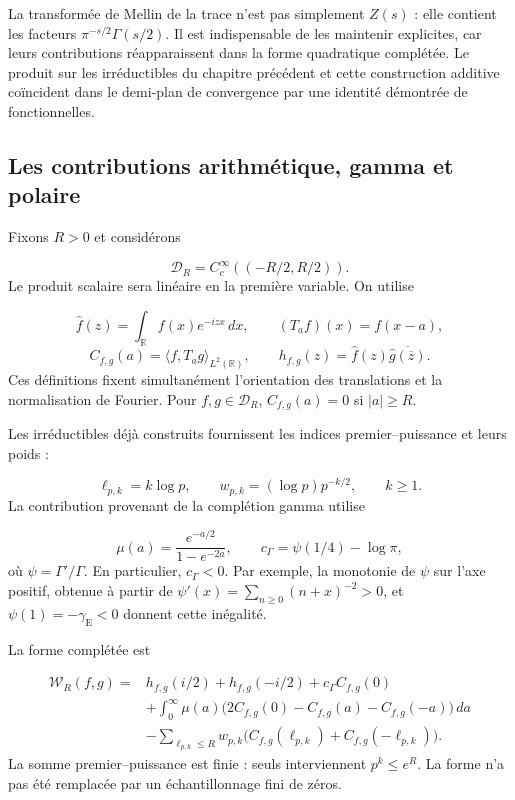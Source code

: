 La transformée de Mellin de la trace n'est pas simplement \(Z(s)\) : elle contient les facteurs \(\pi^{-s/2}\Gamma(s/2)\). Il est indispensable de les maintenir explicites, car leurs contributions réapparaissent dans la forme quadratique complétée. Le produit sur les irréductibles du chapitre précédent et cette construction additive coïncident dans le demi-plan de convergence par une identité démontrée de fonctionnelles.

\subsection{Les contributions arithmétique, gamma et polaire}
\label{rz:forma}
Fixons \(R>0\) et considérons

\[
\mathcal D_R=C_c^\infty((-R/2,R/2)).
\]
Le produit scalaire sera linéaire en la première variable. On utilise

\[
\widehat f(z)=\int_{\mathbb R}f(x)e^{-izx}\,dx,\qquad
(T_af)(x)=f(x-a),
\]
\[
C_{f,g}(a)=\langle f,T_ag\rangle_{L^2(\mathbb R)},\qquad
h_{f,g}(z)=\widehat f(z)\overline{\widehat g(\overline z)}.
\]
Ces définitions fixent simultanément l'orientation des translations et la normalisation de Fourier. Pour \(f,g\in\mathcal D_R\), \(C_{f,g}(a)=0\) si \(|a|\geq R\).

Les irréductibles déjà construits fournissent les indices premier–puissance et leurs poids :

\[
\ell_{p,k}=k\log p,\qquad
w_{p,k}=(\log p)p^{-k/2},\qquad k\geq1.
\]
La contribution provenant de la complétion gamma utilise

\[
\mu(a)=\frac{e^{-a/2}}{1-e^{-2a}},\qquad
c_\Gamma=\psi(1/4)-\log\pi,
\]
où \(\psi=\Gamma'/\Gamma\). En particulier, \(c_\Gamma<0\). Par exemple, la monotonie de \(\psi\) sur l’axe positif, obtenue à partir de \(\psi'(x)=\sum_{n\geq0}(n+x)^{-2}>0\), et \(\psi(1)=-\gamma_{\mathrm E}<0\) donnent cette inégalité.

La forme complétée est

\[
\begin{aligned}
\mathscr W_R(f,g)={}&h_{f,g}(i/2)+h_{f,g}(-i/2)
+c_\Gamma C_{f,g}(0)\\
&+\int_0^\infty\mu(a)
\bigl(2C_{f,g}(0)-C_{f,g}(a)-C_{f,g}(-a)\bigr)\,da\\
&-\sum_{\ell_{p,k}\leq R}w_{p,k}
\bigl(C_{f,g}(\ell_{p,k})+C_{f,g}(-\ell_{p,k})\bigr).
\end{aligned}
\]
La somme premier–puissance est finie : seuls interviennent \(p^k\leq e^R\). La forme n'a pas été remplacée par un échantillonnage fini de zéros.

